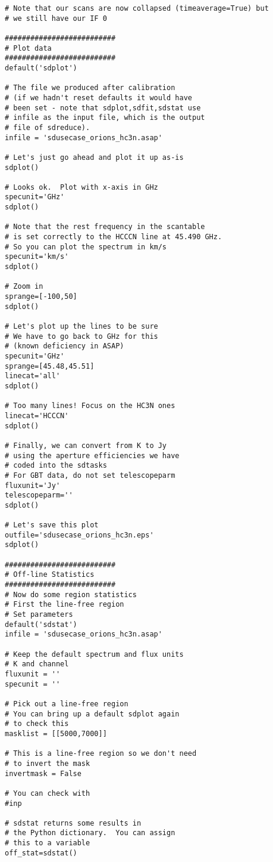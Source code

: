 \normalsize
\begin{verbatim}
# Note that our scans are now collapsed (timeaverage=True) but 
# we still have our IF 0

##########################
# Plot data
##########################
default('sdplot')

# The file we produced after calibration
# (if we hadn't reset defaults it would have
# been set - note that sdplot,sdfit,sdstat use
# infile as the input file, which is the output
# file of sdreduce).
infile = 'sdusecase_orions_hc3n.asap'

# Let's just go ahead and plot it up as-is
sdplot()

# Looks ok.  Plot with x-axis in GHz
specunit='GHz'
sdplot()

# Note that the rest frequency in the scantable
# is set correctly to the HCCCN line at 45.490 GHz.
# So you can plot the spectrum in km/s
specunit='km/s'
sdplot()

# Zoom in
sprange=[-100,50]
sdplot()

# Let's plot up the lines to be sure
# We have to go back to GHz for this
# (known deficiency in ASAP)
specunit='GHz'
sprange=[45.48,45.51]
linecat='all'
sdplot()

# Too many lines! Focus on the HC3N ones
linecat='HCCCN'
sdplot()

# Finally, we can convert from K to Jy
# using the aperture efficiencies we have
# coded into the sdtasks
# For GBT data, do not set telescopeparm
fluxunit='Jy'
telescopeparm=''
sdplot()

# Let's save this plot
outfile='sdusecase_orions_hc3n.eps'
sdplot()

##########################
# Off-line Statistics
##########################
# Now do some region statistics
# First the line-free region
# Set parameters
default('sdstat')
infile = 'sdusecase_orions_hc3n.asap'

# Keep the default spectrum and flux units
# K and channel
fluxunit = ''
specunit = ''

# Pick out a line-free region
# You can bring up a default sdplot again
# to check this
masklist = [[5000,7000]]

# This is a line-free region so we don't need
# to invert the mask
invertmask = False

# You can check with
#inp

# sdstat returns some results in
# the Python dictionary.  You can assign
# this to a variable
off_stat=sdstat()


\end{verbatim}
